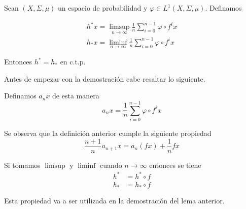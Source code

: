 \begin{lema}\label{birkhoff_lema1}
	Sean $(X,\Sigma,\mu)$ un espacio de probabilidad y $\varphi \in L^1(X,\Sigma,\mu)$. Definamos
	
	\begin{gather}
		h^* x = \limsup_{n \rightarrow \infty} \frac{1}{n} \sum_{i=0}^{n-1} \varphi \circ f^i x\\
		h_* x = \liminf_{n \rightarrow \infty} \frac{1}{n} \sum_{i=0}^{n-1} \varphi \circ f^i x
	\end{gather}
	
	Entonces $h^* = h_*$ en c.t.p.
	
\end{lema}

Antes de empezar con la demostración cabe resaltar lo siguiente. 

Definamos $a_n x$ de esta manera
\begin{equation}
a_n x = \frac{1}{n} \sum_{i=0}^{n-1} \varphi \circ f^i x
\end{equation}

Se observa que la definición anterior cumple la siguiente propiedad
\begin{equation}
\frac{n+1}{n} a_{n+1} x = a_n (fx) + \frac{1}{n} f x
\end{equation}

Si tomamos $\limsup$ y $\liminf$ cuando $n \rightarrow \infty$ entonces se tiene
\begin{align}
h^* &= h^* \circ f\\
h_* &= h_* \circ f
\end{align}

Esta propiedad va a ser utilizada en la demostración del lema anterior.

